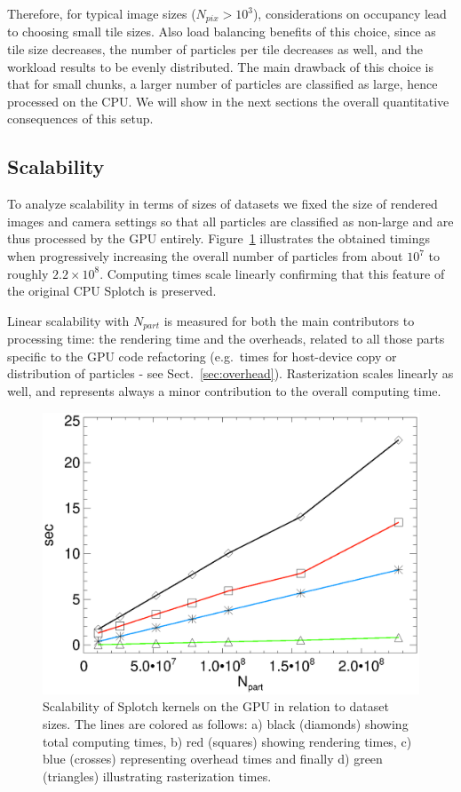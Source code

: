 \documentclass[smallextended]{svjour3}
\begin{document}
Therefore, for typical image sizes ($N_{pix} > 10^3$), considerations on occupancy lead to choosing  small tile sizes. Also load balancing benefits of this choice, since as tile size decreases, the number of particles per tile decreases as well, and the workload results to be evenly distributed.
The main drawback of this choice is that for small chunks, a larger number of particles are classified as large, hence processed on the CPU. We will show in the next sections the overall quantitative consequences of this setup.  

\subsection{Scalability}
\label{sec:scalability}
To analyze scalability in terms of sizes of datasets we fixed the size of rendered images and camera settings so that all particles are classified as non-large and are thus processed by the GPU entirely. 
Figure~\ref{fig:scalability} illustrates the obtained timings when progressively increasing the overall number of particles
from about $10^7$ to roughly $2.2\times10^8$. Computing times scale linearly confirming that this feature of the original CPU Splotch is preserved. 

Linear scalability with $N_{part}$ is measured for both the main contributors to processing time: the rendering time and the overheads, related to all those parts specific to the GPU code refactoring (e.g.\ times for host-device copy or distribution of particles - see Sect.~\ref{sec:overhead}).
Rasterization scales linearly as well, and represents always a minor contribution to the overall computing time.   

\begin{figure}
\includegraphics[scale=0.5]{scalan.eps}
\caption{Scalability of Splotch kernels on the GPU in relation to dataset sizes. 
The lines are colored as follows: a) black (diamonds) showing total computing times, b) red (squares) showing rendering times, c) blue (crosses) representing overhead times and finally d) green (triangles) illustrating rasterization times.}
\label{fig:scalability}
\end{figure}
 
\end{document}
